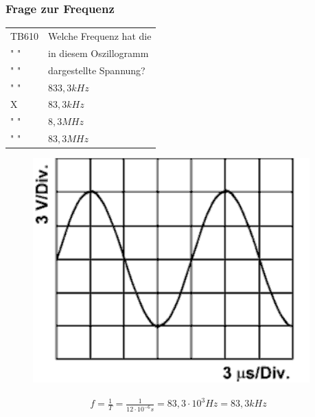 \begin{frame}
  \frametitle{Frage zur Frequenz}
  \begin{minipage}{0.6\textwidth}
    \begin{tabular}{l||l}\hline
        TB610& Welche Frequenz hat die\\
        " " &  in diesem Oszillogramm\\
        " " & dargestellte Spannung?\\ \hline\hline
         " " & $833,3 kHz$ \\ \hline
         X & $83,3kHz$\\ \hline
         " "& $8,3MHz$ \\\hline
         " " & $83,3MHz$ \\\hline
      \end{tabular}
  \end{minipage}
  \begin{minipage}{0.3\textwidth}
    \begin{figure}
       \includegraphics[width=.9\textwidth]{e02/TB610}
     \end{figure}
    \end{minipage}
      \begin{align} 
        f=\frac{1}{T}=\frac{1}{12 \cdot 10^{-6}s}=83,3 \cdot 10^{3} Hz= 83,3 kHz
\end{align}
\end{frame}

